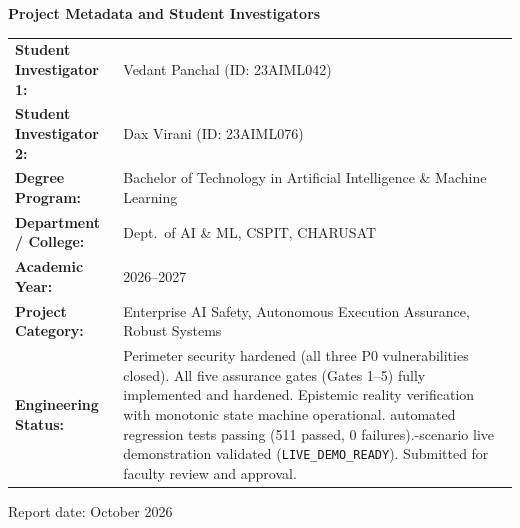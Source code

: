 \documentclass[11pt,a4paper]{article}
\begin{document}
\begin{titlepage}
\vspace{0.6cm}
\begin{tcolorbox}[colback=lightgreybg,colframe=primarynavy,arc=2mm,boxrule=0.8pt,width=\linewidth]
\centering\sffamily\textbf{\large Project Metadata and Student Investigators}\\[0.2cm]
\small
\begin{tabularx}{\linewidth}{@{}L{4.0cm}Y@{}}
\textbf{Student Investigator 1:} & Vedant Panchal (ID: 23AIML042)\\[2pt]
\textbf{Student Investigator 2:} & Dax Virani (ID: 23AIML076)\\[2pt]
\textbf{Degree Program:} & Bachelor of Technology in Artificial Intelligence \& Machine Learning\\[2pt]
\textbf{Department / College:} & Dept.\ of AI \& ML, CSPIT, CHARUSAT\\[2pt]
\textbf{Academic Year:} & 2026--2027\\[2pt]
\textbf{Project Category:} & Enterprise AI Safety, Autonomous Execution Assurance, Robust Systems\\[2pt]
\textbf{Engineering Status:} &
  Perimeter security hardened (all three P0 vulnerabilities closed).\newline
  All five assurance gates (Gates 1--5) fully implemented and hardened.\newline
  Epistemic reality verification with monotonic state machine operational. automated regression tests passing (511 passed, 0 failures).-scenario live demonstration validated (\texttt{LIVE\_DEMO\_READY}).\newline
  Submitted for faculty review and approval.
\end{tabularx}
\end{tcolorbox}
\vfill
{\small\color{darkslate} Report date: October 2026\par}
\end{titlepage}
\end{document}
